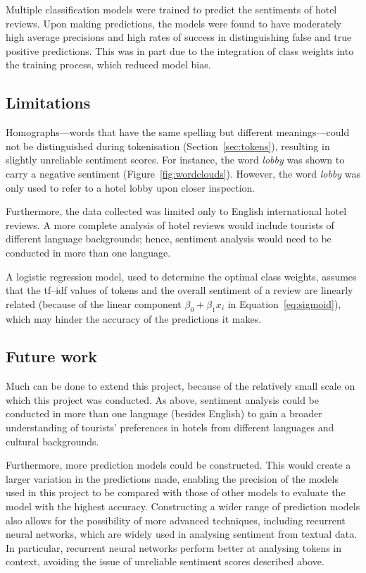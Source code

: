 \documentclass[12pt, a4paper, oneside]{pancake-article}
\begin{document}
Multiple classification models were trained to
predict the sentiments of hotel reviews. Upon making predictions, the models
were found to have moderately high average precisions and high rates of
success in distinguishing false and true positive predictions. This was
in part due to the integration of class weights into the training process,
which reduced model bias.

\subsection{Limitations}

Homographs---words that have the same spelling but different meanings---could
not be distinguished during tokenisation (Section~\ref{sec:tokens}),
resulting in
slightly unreliable sentiment scores. For instance, the word
\textit{lobby} was shown to
carry a negative sentiment (Figure~\ref{fig:wordclouds}). However,
the word \textit{lobby}
was only used to refer to a hotel lobby upon closer inspection.

Furthermore, the data collected was limited only to English
international hotel reviews.
A more complete analysis of hotel reviews would include tourists of
different language
backgrounds; hence, sentiment analysis would need to be conducted in
more than one language.

A logistic regression model, used to determine the optimal class
weights, assumes that the tf--idf values of tokens
and the overall sentiment of a review are linearly related (because
  of the linear component $\beta_0 + \beta_1x_i$
in Equation~\ref{eq:sigmoid}), which may hinder the accuracy of the
predictions it makes.

\subsection{Future work}

Much can be done to extend this project, because of the relatively
small scale on which this project
was conducted. As above, sentiment analysis could be conducted in
more than one language (besides English)
to gain a broader understanding of tourists' preferences in hotels
from different languages and cultural
backgrounds.

Furthermore, more prediction models could be constructed. This would
create a larger
variation in the predictions made, enabling the precision of the
models used in this project to be
compared with those of other models to evaluate the model with the
highest accuracy. Constructing a
wider range of prediction models also allows for the possibility of
more advanced techniques,
including recurrent neural networks, which are
widely used in analysing sentiment from textual data. In particular,
recurrent neural
networks perform better at analysing tokens in context, avoiding the issue
of unreliable sentiment scores described above.

\pagebreak
\printbibliography[heading=bibintoc]
\end{document}
